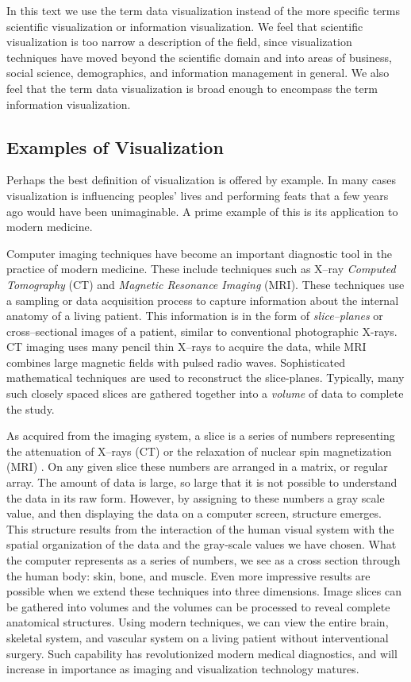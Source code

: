In this text we use the term data visualization instead of the more specific terms scientific visualization or information visualization. We feel that scientific visualization is too narrow a description of the field, since visualization techniques have moved beyond the scientific domain and into areas of business, social science, demographics, and information management in general.
We also feel that the term data visualization is broad enough to encompass the term information visualization.

\subsection{Examples of Visualization}
Perhaps the best definition of visualization is offered by example. In many cases visualization is influencing peoples' lives and performing feats that a few years ago would have been unimaginable. A prime example of this is its application to modern medicine.

Computer imaging techniques have become an important diagnostic tool in the practice of modern medicine. These include techniques such as X--ray \emph{Computed Tomography} (CT) and \emph{Magnetic Resonance Imaging} (MRI). These techniques use a sampling or data acquisition process to capture information about the internal anatomy of a living patient. This information is in the form of \emph{slice--planes} or cross--sectional images of a patient, similar to conventional photographic X-rays. CT imaging uses many pencil thin X--rays to acquire the data, while MRI combines large magnetic fields with pulsed radio waves. Sophisticated mathematical techniques are used to reconstruct the slice-planes. Typically, many such closely spaced slices are gathered together into a \emph{volume} of data to complete the study.

As acquired from the imaging system, a slice is a series of numbers representing the attenuation of X--rays (CT) or the relaxation of nuclear spin magnetization (MRI) \cite{Krestel90}. On any given slice these numbers are arranged in a matrix, or regular array. The amount of data is large, so large that it is not possible to understand the data in its raw form. However, by assigning to these numbers a gray scale value, and then displaying the data on a computer screen, structure emerges. This structure results from the interaction of the human visual system with the spatial organization of the data and the gray-scale values we have chosen. What the computer represents as a series of numbers, we see as a cross section through the human body: skin, bone, and muscle. Even more impressive results are possible when we extend these techniques into three dimensions. Image slices can be gathered into volumes and the volumes can be processed to reveal complete anatomical structures. Using modern techniques, we can view the entire brain, skeletal system, and vascular system on a living patient without interventional surgery. Such capability has revolutionized modern medical diagnostics, and will increase in importance as imaging and visualization technology matures.

